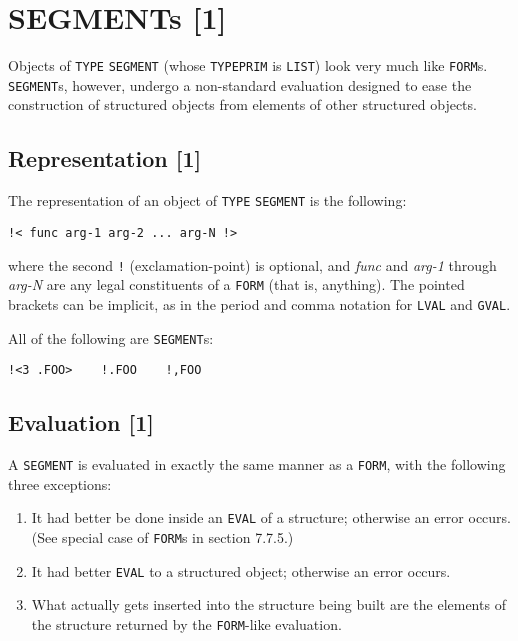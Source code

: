\documentclass[a4paper]{scrbook}
\providecommand{\tightlist}{%
  \setlength{\itemsep}{0pt}\setlength{\parskip}{0pt}}
\begin{document}
\section{SEGMENTs {[}1{]}}\label{segments-1}

Objects of \texttt{TYPE} \texttt{SEGMENT} (whose \texttt{TYPEPRIM} is \texttt{LIST}) look
very much like \texttt{FORM}s. \texttt{SEGMENT}s, however, undergo a non-standard evaluation designed to ease the
construction of structured objects from elements of other structured objects.

\subsection{Representation {[}1{]}}\label{representation-1-2}

The representation of an object of \texttt{TYPE} \texttt{SEGMENT} is the following:

\begin{verbatim}
!< func arg-1 arg-2 ... arg-N !>
\end{verbatim}

 where the second \texttt{!} (exclamation-point) is optional, and
\emph{func} and \emph{arg-1} through \emph{arg-N} are any legal constituents of a \texttt{FORM} (that is, anything). The
pointed brackets can be implicit, as in the period and comma notation for \texttt{LVAL} and \texttt{GVAL}.

All of the following are \texttt{SEGMENT}s:

\begin{verbatim}
!<3 .FOO>    !.FOO    !,FOO
\end{verbatim}


\subsection{Evaluation {[}1{]}}\label{evaluation-1-1}

A \texttt{SEGMENT} is evaluated in exactly the same manner as a \texttt{FORM}, with the following three exceptions:

\begin{enumerate}
\def\labelenumi{\arabic{enumi}.}
\tightlist
\item
  It had better be done inside an \texttt{EVAL} of a structure; otherwise an error occurs. (See special case of
  \texttt{FORM}s in section 7.7.5.)
\item
  It had better \texttt{EVAL} to a structured object; otherwise an error occurs.
\item
  What actually gets inserted into the structure being built are the elements of the structure returned by the
  \texttt{FORM}-like evaluation.
\end{enumerate}
\end{document}

